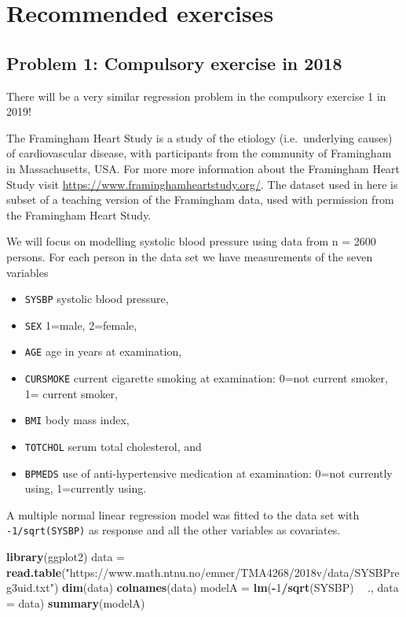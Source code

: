 \documentclass[]{article}
\newenvironment{Shaded}{\begin{snugshade}}{\end{snugshade}}
\newcommand{\DataTypeTok}[1]{\textcolor[rgb]{0.13,0.29,0.53}{#1}}
\newcommand{\DecValTok}[1]{\textcolor[rgb]{0.00,0.00,0.81}{#1}}
\newcommand{\KeywordTok}[1]{\textcolor[rgb]{0.13,0.29,0.53}{\textbf{#1}}}
\newcommand{\NormalTok}[1]{#1}
\newcommand{\OperatorTok}[1]{\textcolor[rgb]{0.81,0.36,0.00}{\textbf{#1}}}
\newcommand{\StringTok}[1]{\textcolor[rgb]{0.31,0.60,0.02}{#1}}
\providecommand{\tightlist}{%
  \setlength{\itemsep}{0pt}\setlength{\parskip}{0pt}}
\begin{document}
\hypertarget{recommended-exercises}{%
\section{Recommended exercises}\label{recommended-exercises}}

\hypertarget{problem-1-compulsory-exercise-in-2018}{%
\subsection{Problem 1: Compulsory exercise in
2018}\label{problem-1-compulsory-exercise-in-2018}}

There will be a very similar regression problem in the compulsory
exercise 1 in 2019!

The Framingham Heart Study is a study of the etiology (i.e.~underlying
causes) of cardiovascular disease, with participants from the community
of Framingham in Massachusetts, USA. For more more information about the
Framingham Heart Study visit
\url{https://www.framinghamheartstudy.org/}. The dataset used in here is
subset of a teaching version of the Framingham data, used with
permission from the Framingham Heart Study.

We will focus on modelling systolic blood pressure using data from n =
2600 persons. For each person in the data set we have measurements of
the seven variables

\begin{itemize}
\tightlist
\item
  \texttt{SYSBP} systolic blood pressure,
\item
  \texttt{SEX} 1=male, 2=female,
\item
  \texttt{AGE} age in years at examination,
\item
  \texttt{CURSMOKE} current cigarette smoking at examination: 0=not
  current smoker, 1= current smoker,
\item
  \texttt{BMI} body mass index,
\item
  \texttt{TOTCHOL} serum total cholesterol, and
\item
  \texttt{BPMEDS} use of anti-hypertensive medication at examination:
  0=not currently using, 1=currently using.
\end{itemize}

A multiple normal linear regression model was fitted to the data set
with \texttt{-1/sqrt(SYSBP)} as response and all the other variables as
covariates.

\begin{Shaded}
\begin{Highlighting}[]
\KeywordTok{library}\NormalTok{(ggplot2)}
\NormalTok{data =}\StringTok{ }\KeywordTok{read.table}\NormalTok{(}\StringTok{"https://www.math.ntnu.no/emner/TMA4268/2018v/data/SYSBPreg3uid.txt"}\NormalTok{)}
\KeywordTok{dim}\NormalTok{(data)}
\KeywordTok{colnames}\NormalTok{(data)}
\NormalTok{modelA =}\StringTok{ }\KeywordTok{lm}\NormalTok{(}\OperatorTok{-}\DecValTok{1}\OperatorTok{/}\KeywordTok{sqrt}\NormalTok{(SYSBP) }\OperatorTok{~}\StringTok{ }\NormalTok{., }\DataTypeTok{data =}\NormalTok{ data)}
\KeywordTok{summary}\NormalTok{(modelA)}
\end{Highlighting}
\end{Shaded}
\end{document}
